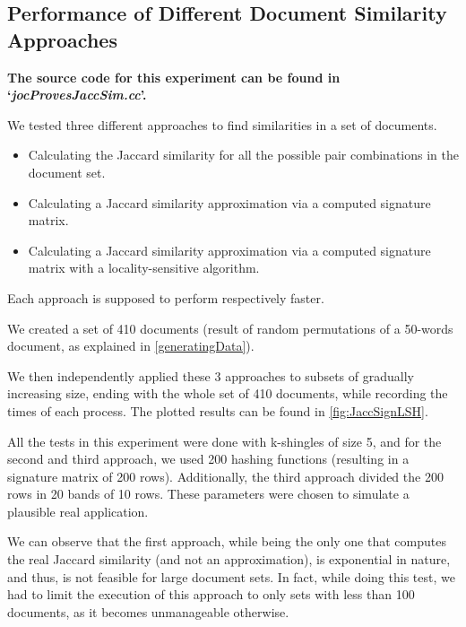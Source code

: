 \documentclass[12pt]{article}
\begin{document}

\subsection{Performance of Different Document Similarity Approaches}
\textbf{The source code for this experiment can be found in `\textit{jocProvesJaccSim.cc}'.}
\bigskip

We tested three different approaches to find similarities in a set of documents.
\begin{itemize}
\item Calculating the Jaccard similarity for all the possible pair combinations in the document set.
\item Calculating a Jaccard similarity approximation via a computed signature matrix.
\item Calculating a Jaccard similarity approximation via a computed signature matrix with a locality-sensitive algorithm.
\end{itemize}

Each approach is supposed to perform respectively faster.

\bigskip
We created a set of 410 documents (result of random permutations of a 50-words document, as explained in \autoref{generatingData}). 

We then independently applied these 3 approaches to subsets of gradually increasing size, ending with the whole set of 410 documents, while recording the times of each process.
The plotted results can be found in \autoref{fig:JaccSignLSH}.

All the tests in this experiment were done with k-shingles of size 5, and for the second and third approach, we used 200 hashing functions (resulting in a signature matrix of 200 rows). Additionally, the third approach divided the 200 rows in 20 bands of 10 rows. These parameters were chosen to simulate a plausible real application.

\bigskip

We can observe that the first approach, while being the only one that computes the real Jaccard similarity (and not an approximation), is exponential in nature, and thus, is not feasible for large document sets. In fact, while doing this test, we had to limit the execution of this approach to only sets with less than 100 documents, as it becomes unmanageable otherwise.
\end{document}
